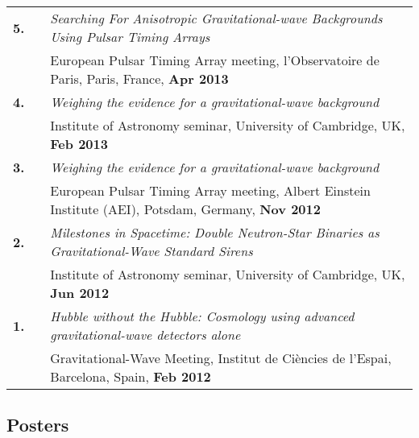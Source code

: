 \documentclass[11pt,letterpaper,sans]{moderncv}
\begin{document}
{\begin{longtable}{rp{0.3cm}p{15.8cm}}
\textbf{5.} & & \textit{Searching For Anisotropic Gravitational-wave Backgrounds Using Pulsar Timing Arrays} \\ 
&& European Pulsar Timing Array meeting, l'Observatoire de Paris, Paris, France, \textbf{Apr 2013} \vspace{0.09cm}\\
\textbf{4.} & & \textit{Weighing the evidence for a gravitational-wave background} \\ 
&& Institute of Astronomy seminar, University of Cambridge, UK, \textbf{Feb 2013} \vspace{0.09cm}\\
\textbf{3.} & & \textit{Weighing the evidence for a gravitational-wave background} \\ 
&& European Pulsar Timing Array meeting, Albert Einstein Institute (AEI), Potsdam, Germany, \textbf{Nov 2012} \vspace{0.09cm}\\
\textbf{2.} & & \textit{Milestones in Spacetime: Double Neutron-Star Binaries as Gravitational-Wave Standard Sirens} \\ 
&& Institute of Astronomy seminar, University of Cambridge, UK, \textbf{Jun 2012} \vspace{0.09cm}\\
\textbf{1.} & & \textit{Hubble without the Hubble: Cosmology using advanced gravitational-wave detectors alone} \\ 
&& Gravitational-Wave Meeting, Institut de Ci\`encies de l'Espai, Barcelona, Spain, \textbf{Feb 2012} 
\end{longtable}
}

\subsection{Posters}\vspace{-0.6cm}
\end{document}
